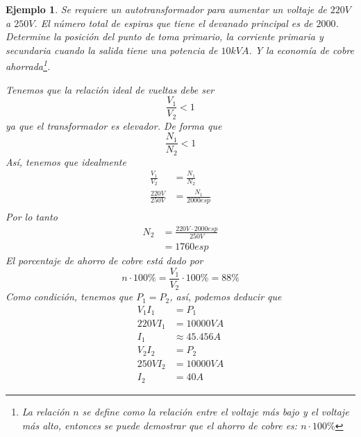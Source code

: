 \documentclass[11pt]{report}
\newtheorem{example}{Ejemplo}[section]
\begin{document}
\begin{example}
        Se requiere un autotransformador para aumentar un voltaje de $220V$ a $250V$.
        El número total de espiras que tiene el devanado principal es de $2000$. Determine 
        la posición del punto de toma primario, la corriente primaria y secundaria cuando 
        la salida tiene una potencia de $10{kVA}$. Y la economía de cobre ahorrada\footnote{La 
        relación $n$ se define como la relación entre el voltaje más bajo y el voltaje más alto,
        entonces se puede demostrar que el ahorro de cobre es: $n\cdot100\%$}.

        Tenemos que la relación ideal de vueltas debe ser 
        \begin{equation}
            \frac{V_1}{V_2} < 1
        \end{equation}
        ya que el transformador es elevador. De forma que 
        \begin{equation}
            \frac{N_1}{N_2} < 1
        \end{equation}
        Así, tenemos que idealmente 
        \begin{equation}
            \begin{split}
                \frac{V_1}{V_2} &= \frac{N_1}{N_2} \\
                \frac{220V}{250V} &= \frac{N_1}{2000esp} \\
            \end{split}
        \end{equation}
        Por lo tanto 
        \begin{equation}
            \begin{split}
                N_2 &= \frac{220 V \cdot 2000esp}{250V} \\&= 1760 esp
            \end{split}
        \end{equation}        
        El porcentaje de ahorro de cobre está dado por 
        \begin{equation}
            n\cdot 100\% = \frac{V_1}{V_2}\cdot 100\% = 88\% 
        \end{equation}
        Como condición, tenemos que $P_1 = P_2$, así, podemos deducir que 
        \begin{equation}
            \begin{split}
                V_1 I_1 &= P_1 \\
                220V I_1 &= 10000VA \\
                I_1 &\approx 45.456A
            \end{split}
        \end{equation}
        \begin{equation}
            \begin{split}
                V_2 I_2 &= P_2 \\
                250V I_2 &= 10000VA \\
                I_2 &= 40A
            \end{split}
        \end{equation}
    \end{example}
\end{document}
